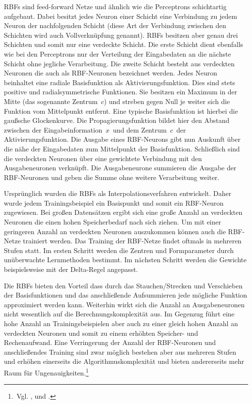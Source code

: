 RBFs sind feed-forward Netze und ähnlich wie die Perceptrons schichtartig aufgebaut. Dabei besitzt jedes Neuron einer Schicht eine Verbindung zu jedem Neuron der nachfolgenden Schicht (diese Art der Verbindung zwischen den Schichten wird auch Vollverknüpfung genannt). RBFs besitzen aber genau drei Schichten und somit nur eine verdeckte Schicht. Die erste Schicht dient ebenfalls wie bei den Perceptrons nur der Verteilung der Eingabedaten an die nächste Schicht ohne jegliche Verarbeitung. Die zweite Schicht besteht aus verdeckten Neuronen die auch als RBF-Neuronen  bezeichnet werden. Jedes Neuron beinhaltet eine radiale Basisfunktion als Aktivierungsfunktion. Dies sind stets positive und radialsymmetrische Funktionen. Sie besitzen ein Maximum in der Mitte (das sogenannte Zentrum~$c$) und streben gegen Null je weiter sich die Funktion vom Mittelpunkt entfernt. Eine typische Basisfunktion ist hierbei die gaußsche Glockenkurve. Die Propagierungsfunktion bildet hier den Abstand zwischen der Eingabeinformation~$x$~und dem Zentrum~$c$~der Aktivierungsfunktion. Die Ausgabe eines RBF-Neurons gibt nun Auskunft über die nähe der Eingabedaten zum Mittelpunkt der Basisfunktion. Schließlich sind die verdeckten Neuronen über eine gewichtete Verbindung mit den Ausgabeneuronen  verknüpft. Die Ausgabeneurone summieren die Ausgabe der RBF-Neuronen und geben die Summe ohne weitere Verarbeitung weiter.

Ursprünglich wurden die RBFs als Interpolationsverfahren entwickelt. Daher wurde jedem Trainingsbeispiel ein Basispunkt und somit ein RBF-Neuron zugewiesen. Bei großen Datensätzen ergibt sich eine große Anzahl an verdeckten Neuronen die einen hohen Speicherbedarf nach sich ziehen. Um mit einer geringeren Anzahl an verdeckten Neuronen auszukommen können auch die RBF-Netze trainiert werden. Das Training der RBF-Netze findet oftmals in mehreren Stufen statt. Im ersten Schritt werden die Zentren und Formparameter durch unüberwachte Lernmethoden bestimmt. Im nächsten Schritt werden die Gewichte beispielsweise mit der Delta-Regel angepasst.

Die RBFs bieten den Vorteil dass durch das Stauchen/Strecken und Verschieben der Basisfunktionen und das anschließende Aufsummieren jede mögliche Funktion approximiert werden kann. Weiterhin wirkt sich die Anzahl an Ausgabeneuronen nicht wesentlich auf die Berechnungskomplexität aus. Im Gegenzug führt eine hohe Anzahl an Trainingsbeispielen aber auch zu einer gleich hohen Anzahl an verdeckten Neuronen und somit zu einem erhöhten Speicher- und Rechenaufwand. Eine Verringerung der Anzahl der RBF-Neuronen und anschließendes Training sind zwar möglich bestehen aber aus mehreren Stufen und erhöhen einerseits die Algorithmuskomplexität und bieten andererseits mehr Raum für Ungenauigkeiten.\footnote{\,Vgl. \citet[73 ff]{comp_int_07}, \citet[109 ff]{dkriesel07} und \citet[261 ff]{Kroll16}.}



